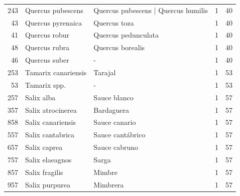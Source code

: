 \begin{longtable}{r p{4cm} p{5cm} c c}
    243           & Quercus pubescens                 & Quercus pubescens | Quercus humilis           & 1             & 40             \\
    43            & Quercus pyrenaica                 & Quercus toza                                  & 1             & 40             \\
    41            & Quercus robur                     & Quercus pedunculata                           & 1             & 40             \\
    48            & Quercus rubra                     & Quercus borealis                              & 1             & 40             \\
    46            & Quercus suber                     & -                                             & 1             & 40             \\
    253           & Tamarix canariensis               & Tarajal                                       & 1             & 53             \\
    53            & Tamarix spp.                      & -                                             & 1             & 53             \\
    257           & Salix alba                        & Sauce blanco                                  & 1             & 57             \\
    357           & Salix atrocinerea                 & Bardaguera                                    & 1             & 57             \\
    858           & Salix canariensis                 & Sauce canario                                 & 1             & 57             \\
    557           & Salix cantabrica                  & Sauce cantábrico                              & 1             & 57             \\
    657           & Salix caprea                      & Sauce cabruno                                 & 1             & 57             \\
    757           & Salix elaeagnos                   & Sarga                                         & 1             & 57             \\
    857           & Salix fragilis                    & Mimbre                                        & 1             & 57             \\
    957           & Salix purpurea                    & Mimbrera                                      & 1             & 57             \\

\end{longtable}
